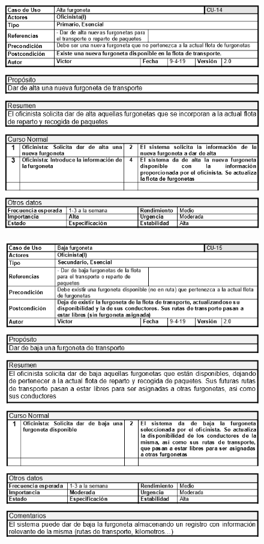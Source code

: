 \begin{figure}[H]
	\centering
	\includegraphics[width=16cm]{14}
\end{figure}
\begin{figure}[H]
	\centering
	\includegraphics[width=16cm]{15}
\end{figure}
